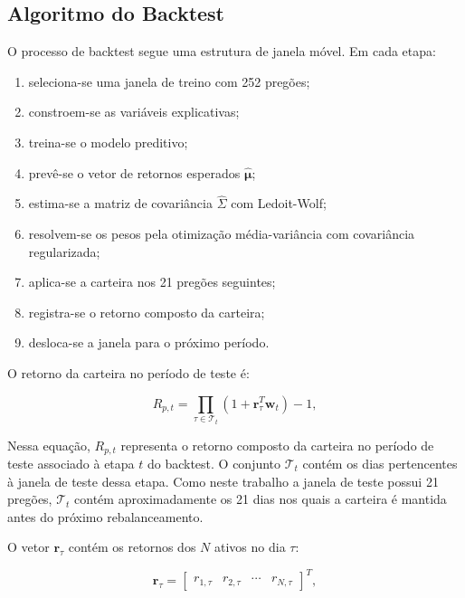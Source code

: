 \documentclass[12pt,a4paper]{article}
\begin{document}
\subsection{Algoritmo do Backtest}

O processo de backtest segue uma estrutura de janela móvel. Em cada etapa:

\begin{enumerate}
    \item seleciona-se uma janela de treino com 252 pregões;
    \item constroem-se as variáveis explicativas;
    \item treina-se o modelo preditivo;
    \item prevê-se o vetor de retornos esperados $\hat{\boldsymbol{\mu}}$;
    \item estima-se a matriz de covariância $\hat{\Sigma}$ com Ledoit-Wolf;
    \item resolvem-se os pesos pela otimização média-variância com covariância regularizada;
    \item aplica-se a carteira nos 21 pregões seguintes;
    \item registra-se o retorno composto da carteira;
    \item desloca-se a janela para o próximo período.
\end{enumerate}

O retorno da carteira no período de teste é:

\begin{equation}
R_{p,t}
=
\prod_{\tau \in \mathcal{T}_t}
\left(1 + \mathbf{r}_{\tau}^{T}\mathbf{w}_t\right)
- 1,
\end{equation}

Nessa equação, $R_{p,t}$ representa o retorno composto da carteira no período de teste associado à etapa $t$ do backtest. O conjunto $\mathcal{T}_t$ contém os dias pertencentes à janela de teste dessa etapa. Como neste trabalho a janela de teste possui 21 pregões, $\mathcal{T}_t$ contém aproximadamente os 21 dias nos quais a carteira é mantida antes do próximo rebalanceamento.

O vetor $\mathbf{r}_{\tau}$ contém os retornos dos $N$ ativos no dia $\tau$:

\begin{equation}
\mathbf{r}_{\tau}
=
\begin{bmatrix}
r_{1,\tau} & r_{2,\tau} & \cdots & r_{N,\tau}
\end{bmatrix}^{T},
\end{equation}
\end{document}
